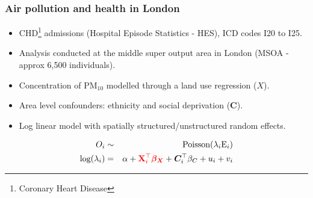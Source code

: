 \documentclass[slidestop,compress,serif,10pt]{beamer}
\begin{document}
\begin{frame}\frametitle{Air pollution and health in London}

\begin{itemize}
\vfill\item CHD\footnote{Coronary Heart Disease} admissions (Hospital Episode Statistics - HES), ICD codes I20 to I25. 
\vfill\item Analysis conducted at the middle super output area in London (MSOA - approx 6,500 individuals).
\vfill\item Concentration of PM$_{10}$ modelled through a land use regression ($X$).
\vfill\item Area level confounders: ethnicity and social deprivation ($\bm{C}$).
\end{itemize}

\begin{itemize}
\item Log linear model with spatially structured/unstructured random effects.
\end{itemize}
\begin{eqnarray*}
O_i &\sim& \text{Poisson}(\lambda_i \text{E}_i)\\
\text{log}(\lambda_i) &=& \alpha + {\color{red} \mathbf{X}_i^\top \boldsymbol{\beta_X}} + \boldsymbol{C}_{i}^\top\beta_{C} + u_i + v_i\end{eqnarray*}
\end{frame}
\end{document}
